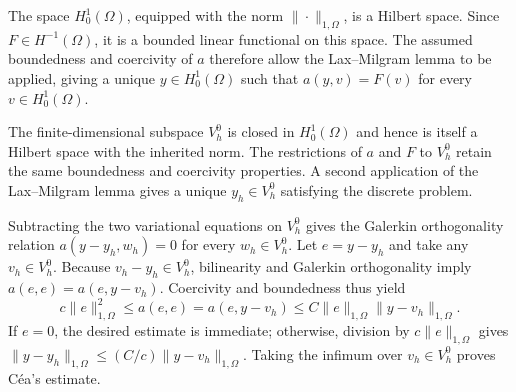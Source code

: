 \documentclass{article}
\begin{document}
The space \(H^1_0(\Omega)\), equipped with the norm \(\|\cdot\|_{1,\Omega}\), is a Hilbert space. Since \(F\in H^{-1}(\Omega)\), it is a bounded linear functional on this space. The assumed boundedness and coercivity of \(a\) therefore allow the Lax--Milgram lemma to be applied, giving a unique \(y\in H^1_0(\Omega)\) such that \(a(y,v)=F(v)\) for every \(v\in H^1_0(\Omega)\).

The finite-dimensional subspace \(V_h^0\) is closed in \(H^1_0(\Omega)\) and hence is itself a Hilbert space with the inherited norm. The restrictions of \(a\) and \(F\) to \(V_h^0\) retain the same boundedness and coercivity properties. A second application of the Lax--Milgram lemma gives a unique \(y_h\in V_h^0\) satisfying the discrete problem.

Subtracting the two variational equations on \(V_h^0\) gives the Galerkin orthogonality relation \(a(y-y_h,w_h)=0\) for every \(w_h\in V_h^0\). Let \(e=y-y_h\) and take any \(v_h\in V_h^0\). Because \(v_h-y_h\in V_h^0\), bilinearity and Galerkin orthogonality imply \(a(e,e)=a(e,y-v_h)\). Coercivity and boundedness thus yield
\[
c\|e\|_{1,\Omega}^{2}\leq a(e,e)=a(e,y-v_h)\leq C\|e\|_{1,\Omega}\|y-v_h\|_{1,\Omega}.
\]
If \(e=0\), the desired estimate is immediate; otherwise, division by \(c\|e\|_{1,\Omega}\) gives \(\|y-y_h\|_{1,\Omega}\leq (C/c)\|y-v_h\|_{1,\Omega}\). Taking the infimum over \(v_h\in V_h^0\) proves Céa's estimate.
\end{document}
